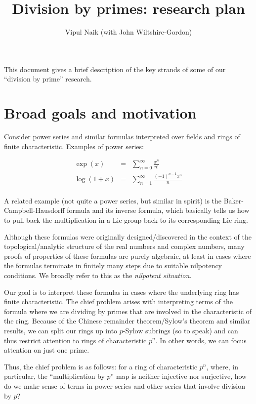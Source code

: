 \documentclass[10pt]{amsart}
\title{Division by primes: research plan}
\author{Vipul Naik (with John Wiltshire-Gordon)}
\begin{document}
\maketitle

This document gives a brief description of the key strands of some of
our ``division by prime'' research.

\section*{Broad goals and motivation}
Consider power series and similar formulas interpreted over fields and
rings of finite characteristic. Examples of power series:

\begin{eqnarray*}
  \exp(x) & = & \sum_{n=0}^\infty \frac{x^n}{n!}\\
  \log(1 + x) & = & \sum_{n=1}^\infty \frac{(-1)^{n-1}x^n}{n}\\
\end{eqnarray*}

A related example (not quite a power series, but similar in spirit) is
the Baker-Campbell-Hausdorff formula and its inverse formula, which
basically tells us how to pull back the multiplication in a Lie group
back to its corresponding Lie ring.

Although these formulas were originally designed/discovered in the
context of the topological/analytic structure of the real numbers and
complex numbers, many proofs of properties of these formulas are
purely algebraic, at least in cases where the formulas terminate in
finitely many steps due to suitable nilpotency conditions. We broadly
refer to this as the {\em nilpotent situation}.

Our goal is to interpret these formulas in cases where the underlying
ring has finite characteristic. The chief problem arises with
interpreting terms of the formula where we are dividing by primes that
are involved in the characteristic of the ring. Because of the Chinese
remainder theorem/Sylow's theorem and similar results, we can split
our rings up into $p$-Sylow subrings (so to speak) and can thus
restrict attention to rings of characteristic $p^n$. In other words,
we can focus attention on just one prime.

Thus, the chief problem is as follows: for a ring of characteristic
$p^n$, where, in particular, the ``multiplication by $p$'' map is
neither injective nor surjective, how do we make sense of terms in
power series and other series that involve division by $p$?
\end{document}
